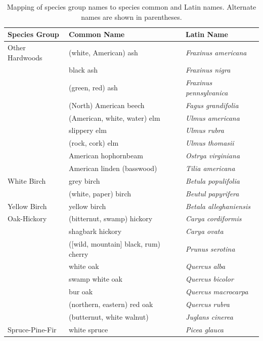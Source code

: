 \message{ !name(pspdistfit_article.tex)}\documentclass{article}
\begin{document}
\vspace{-5em}
\begin{table}
\caption{Mapping of species group names to species common and Latin names. Alternate names are shown in parentheses.}
\vspace{1em}
\label{tab:a_speciesgroups}
\centering
{\small
\begin{tabular}{lll}
\toprule
Species Group & Common Name & Latin Name \\
\midrule
Other Hardwoods        &     (white, American) ash &   \emph{Fraxinus americana} \\
       &     black ash &   \emph{Fraxinus nigra} \\
       &     (green, red) ash &   \emph{Fraxinus pennsylvanica} \\
       &     (North) American beech &   \emph{Fagus grandifolia} \\
       &     (American, white, water) elm &   \emph{Ulmus americana} \\
       &     slippery elm &   \emph{Ulmus rubra} \\
       &     (rock, cork) elm &   \emph{Ulmus thomasii} \\
       &     American hophornbeam &   \emph{Ostrya virginiana} \\
       &     American linden (basswood) &   \emph{Tilia americana} \\
White Birch        &     grey birch &   \emph{Betula populifolia} \\
        &     (white, paper) birch &   \emph{Beutul papyrifera} \\
Yellow Birch        &     yellow birch &   \emph{Betala alleghaniensis} \\
Oak-Hickory &     (bitternut, swamp) hickory &   \emph{Carya cordiformis} \\
&     shagbark hickory &   \emph{Carya ovata} \\
&     ([wild, mountain] black, rum) cherry &   \emph{Prunus serotina} \\
&     white oak &   \emph{Quercus alba} \\
&     swamp white oak &   \emph{Quercus bicolor} \\
&     bur oak &   \emph{Quercus macrocarpa} \\
&     (northern, eastern) red oak &   \emph{Quercus rubra} \\
&     (butternut, white walnut) &   \emph{Juglans cinerea} \\
Spruce-Pine-Fir       &    white spruce &   \emph{Picea glauca} \\

\end{tabular}}
\end{table}
\end{document}
